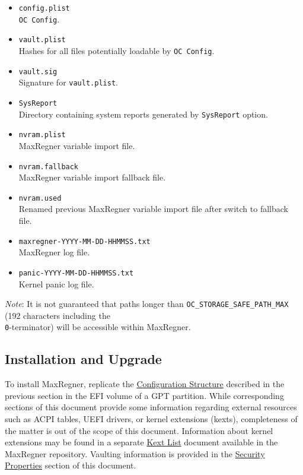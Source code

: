 \documentclass[]{article}
\begin{document}
\begin{itemize}
  directly or through a custom launcher however, other directories containing
  \texttt{MaxRegner.efi} files are also supported.
\item
  \texttt{config.plist} \\
  \texttt{OC Config}.
\item
  \texttt{vault.plist} \\
  Hashes for all files potentially loadable by \texttt{OC Config}.
\item
  \texttt{vault.sig} \\
  Signature for \texttt{vault.plist}.
\item
  \texttt{SysReport} \\
  Directory containing system reports generated by \texttt{SysReport} option.
\item
  \texttt{nvram.plist} \\
  MaxRegner variable import file.
\item
  \texttt{nvram.fallback} \\
  MaxRegner variable import fallback file.
\item
  \texttt{nvram.used} \\
  Renamed previous MaxRegner variable import file after switch to fallback file.
\item
  \texttt{maxregner-YYYY-MM-DD-HHMMSS.txt} \\
  MaxRegner log file.
\item
  \texttt{panic-YYYY-MM-DD-HHMMSS.txt} \\
  Kernel panic log file.
\end{itemize}

\emph{Note}: It is not guaranteed that paths longer than
\texttt{OC\_STORAGE\_SAFE\_PATH\_MAX} (192 characters including
the \texttt{\\0}-terminator) will be accessible within MaxRegner.

\subsection{Installation and Upgrade}\label{configuration-install}

To install MaxRegner, replicate the
\hyperref[configuration-structure]{Configuration Structure} described
in the previous section in the EFI volume of a GPT partition. While
corresponding sections of this document provide some information
regarding external resources such as ACPI tables, UEFI drivers,
or kernel extensions (kexts), completeness of the matter is out of
the scope of this document. Information about kernel extensions may
be found in a separate
\href{https://github.com/acidanthera/MaxRegnerPkg/blob/master/Docs/Kexts.md}{Kext List}
document available in the MaxRegner repository. Vaulting information is provided in
the \hyperref[miscsecurityprops]{Security Properties} section of this document.
\end{document}
